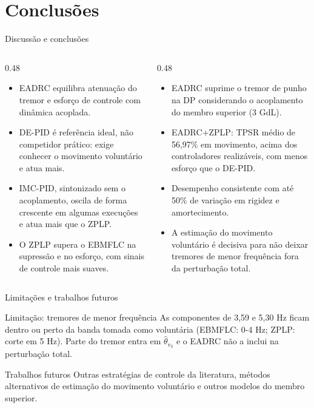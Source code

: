 \section{Conclusões}

\begin{frame}{Discussão e conclusões}
  \begin{columns}[T]
    \begin{column}{0.48\textwidth}
      {\large{}}
      \small
      \begin{itemize}
        \setlength{\itemsep}{0.2cm}
        \item EADRC equilibra atenuação do tremor e esforço de controle com dinâmica acoplada.
        \item DE-PID é referência ideal, não competidor prático: exige conhecer o movimento voluntário e atua mais.
        \item IMC-PID, sintonizado sem o acoplamento, oscila de forma crescente em algumas execuções e atua mais que o ZPLP.
        \item O ZPLP supera o EBMFLC na supressão e no esforço, com sinais de controle mais suaves.
      \end{itemize}
    \end{column}
    \begin{column}{0.48\textwidth}
      {\large{}}
      \small
      \begin{itemize}
        \setlength{\itemsep}{0.2cm}
        \item EADRC suprime o tremor de punho na DP considerando o acoplamento do membro superior (3 GdL).
        \item EADRC+ZPLP: TPSR médio de 56,97\% em movimento, acima dos controladores realizáveis, com menos esforço que o DE-PID.
        \item Desempenho consistente com até 50\% de variação em rigidez e amortecimento.
        \item A estimação do movimento voluntário é decisiva para não deixar tremores de menor frequência fora da perturbação total.
      \end{itemize}
    \end{column}
  \end{columns}
\end{frame}

\begin{frame}{Limitações e trabalhos futuros}
  \vfill
  \begin{alertblock}{Limitação: tremores de menor frequência}
    As componentes de 3,59 e 5,30 Hz ficam dentro ou perto da banda tomada como voluntária (EBMFLC: 0-4 Hz; ZPLP: corte em 5 Hz).
    Parte do tremor entra em $\hat{\theta}_{v_3}$ e o EADRC não a inclui na perturbação total.
  \end{alertblock}
  \vfill
  \begin{exampleblock}{Trabalhos futuros}
    Outras estratégias de controle da literatura, métodos alternativos de estimação do movimento voluntário e outros modelos do membro superior.
  \end{exampleblock}
  \vfill
\end{frame}

